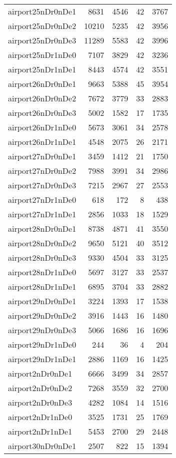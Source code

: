 \documentclass[../../../thesis.tex]{subfiles}
\begin{document}
\begin{longtable}{lrrrr}
airport25nDr0nDe1 & 8631 & 4546 & 42 & 3767 \\
airport25nDr0nDe2 & 10210 & 5235 & 42 & 3956 \\
airport25nDr0nDe3 & 11289 & 5583 & 42 & 3996 \\
airport25nDr1nDe0 & 7107 & 3829 & 42 & 3236 \\
airport25nDr1nDe1 & 8443 & 4574 & 42 & 3551 \\
airport26nDr0nDe1 & 9663 & 5388 & 45 & 3954 \\
airport26nDr0nDe2 & 7672 & 3779 & 33 & 2883 \\
airport26nDr0nDe3 & 5002 & 1582 & 17 & 1735 \\
airport26nDr1nDe0 & 5673 & 3061 & 34 & 2578 \\
airport26nDr1nDe1 & 4548 & 2075 & 26 & 2171 \\
airport27nDr0nDe1 & 3459 & 1412 & 21 & 1750 \\
airport27nDr0nDe2 & 7988 & 3991 & 34 & 2986 \\
airport27nDr0nDe3 & 7215 & 2967 & 27 & 2553 \\
airport27nDr1nDe0 & 618 & 172 & 8 & 438 \\
airport27nDr1nDe1 & 2856 & 1033 & 18 & 1529 \\
airport28nDr0nDe1 & 8738 & 4871 & 41 & 3550 \\
airport28nDr0nDe2 & 9650 & 5121 & 40 & 3512 \\
airport28nDr0nDe3 & 9330 & 4504 & 33 & 3125 \\
airport28nDr1nDe0 & 5697 & 3127 & 33 & 2537 \\
airport28nDr1nDe1 & 6895 & 3704 & 33 & 2882 \\
airport29nDr0nDe1 & 3224 & 1393 & 17 & 1538 \\
airport29nDr0nDe2 & 3916 & 1443 & 16 & 1480 \\
airport29nDr0nDe3 & 5066 & 1686 & 16 & 1696 \\
airport29nDr1nDe0 & 244 & 36 & 4 & 204 \\
airport29nDr1nDe1 & 2886 & 1169 & 16 & 1425 \\
airport2nDr0nDe1 & 6666 & 3499 & 34 & 2857 \\
airport2nDr0nDe2 & 7268 & 3559 & 32 & 2700 \\
airport2nDr0nDe3 & 4282 & 1084 & 14 & 1516 \\
airport2nDr1nDe0 & 3525 & 1731 & 25 & 1769 \\
airport2nDr1nDe1 & 5453 & 2700 & 29 & 2448 \\
airport30nDr0nDe1 & 2507 & 822 & 15 & 1394 \\

\end{longtable}
\end{document}
